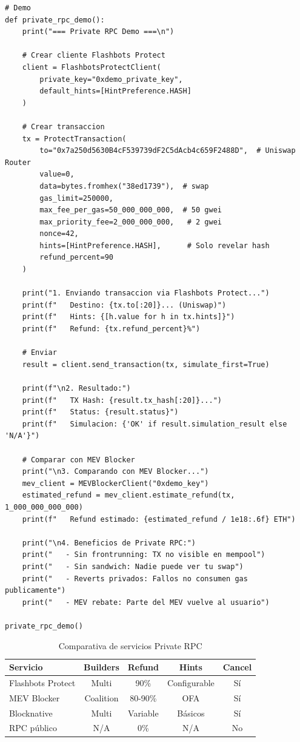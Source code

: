\documentclass[11pt,a4paper,twoside]{book}
\theoremstyle{definition}
\theoremstyle{remark}
\begin{document}
\begin{lstlisting}[style=python, caption={Cliente para Flashbots Protect RPC}]
# Demo
def private_rpc_demo():
    print("=== Private RPC Demo ===\n")
    
    # Crear cliente Flashbots Protect
    client = FlashbotsProtectClient(
        private_key="0xdemo_private_key",
        default_hints=[HintPreference.HASH]
    )
    
    # Crear transaccion
    tx = ProtectTransaction(
        to="0x7a250d5630B4cF539739dF2C5dAcb4c659F2488D",  # Uniswap Router
        value=0,
        data=bytes.fromhex("38ed1739"),  # swap
        gas_limit=250000,
        max_fee_per_gas=50_000_000_000,  # 50 gwei
        max_priority_fee=2_000_000_000,   # 2 gwei
        nonce=42,
        hints=[HintPreference.HASH],      # Solo revelar hash
        refund_percent=90
    )
    
    print("1. Enviando transaccion via Flashbots Protect...")
    print(f"   Destino: {tx.to[:20]}... (Uniswap)")
    print(f"   Hints: {[h.value for h in tx.hints]}")
    print(f"   Refund: {tx.refund_percent}%")
    
    # Enviar
    result = client.send_transaction(tx, simulate_first=True)
    
    print(f"\n2. Resultado:")
    print(f"   TX Hash: {result.tx_hash[:20]}...")
    print(f"   Status: {result.status}")
    print(f"   Simulacion: {'OK' if result.simulation_result else 'N/A'}")
    
    # Comparar con MEV Blocker
    print("\n3. Comparando con MEV Blocker...")
    mev_client = MEVBlockerClient("0xdemo_key")
    estimated_refund = mev_client.estimate_refund(tx, 1_000_000_000_000)
    print(f"   Refund estimado: {estimated_refund / 1e18:.6f} ETH")
    
    print("\n4. Beneficios de Private RPC:")
    print("   - Sin frontrunning: TX no visible en mempool")
    print("   - Sin sandwich: Nadie puede ver tu swap")
    print("   - Reverts privados: Fallos no consumen gas publicamente")
    print("   - MEV rebate: Parte del MEV vuelve al usuario")

private_rpc_demo()
\end{lstlisting}

\begin{table}[htbp]
\centering
\small
\begin{tabular}{lcccc}
\toprule
\textbf{Servicio} & \textbf{Builders} & \textbf{Refund} & \textbf{Hints} & \textbf{Cancel} \\
\midrule
Flashbots Protect & Multi & 90\% & Configurable & Sí \\
MEV Blocker & Coalition & 80-90\% & OFA & Sí \\
Blocknative & Multi & Variable & Básicos & Sí \\
RPC público & N/A & 0\% & N/A & No \\
\bottomrule
\end{tabular}
\caption{Comparativa de servicios Private RPC}
\end{table}
\end{document}

